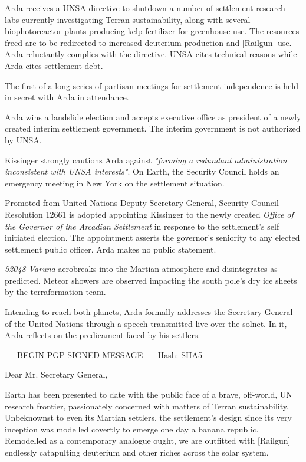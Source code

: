 Arda receives a UNSA directive to shutdown a number of settlement research labs currently investigating Terran sustainability, along with several biophotoreactor plants producing kelp fertilizer for greenhouse use. The resources freed are to be redirected to increased deuterium production and [Railgun] use. Arda reluctantly complies with the directive. UNSA cites technical reasons while Arda cites settlement debt.
\StopTimelineDate

The first of a long series of partisan meetings for settlement independence is held in secret with Arda in attendance.
\StopTimelineDate

Arda wins a landslide election and accepts executive office as president of a newly created interim settlement government. The interim government is not authorized by UNSA. 

Kissinger strongly cautions Arda against {\it "forming a redundant administration inconsistent with UNSA interests"}. On Earth, the Security Council holds an emergency meeting in New York on the settlement situation.
\StopTimelineDate

Promoted from United Nations Deputy Secretary General, Security Council Resolution 12661 is adopted appointing Kissinger to the newly created {\it Office of the Governor of the Arcadian Settlement} in response to the settlement's self initiated election. The appointment asserts the governor's seniority to any elected settlement public officer. Arda makes no public statement.
\StopTimelineDate

{\it 52048 Varuna} aerobreaks into the Martian atmosphere and disintegrates as predicted. Meteor showers are observed impacting the south pole's dry ice sheets by the terraformation team.
\StopTimelineDate

Intending to reach both planets, Arda formally addresses the Secretary General of the United Nations through a speech transmitted live over the solnet. In it, Arda reflects on the predicament faced by his settlers.

\startTimelineDocument
-----BEGIN PGP SIGNED MESSAGE-----
Hash: SHA5

Dear Mr. Secretary General,

Earth has been presented to date with the public face of a brave, off-world, UN research frontier, passionately concerned with matters of Terran sustainability. Unbeknownst to even its Martian settlers, the settlement's design since its very inception was modelled covertly to emerge one day a banana republic. Remodelled as a contemporary analogue ought, we are outfitted with [Railgun] endlessly catapulting deuterium and other riches across the solar system.

